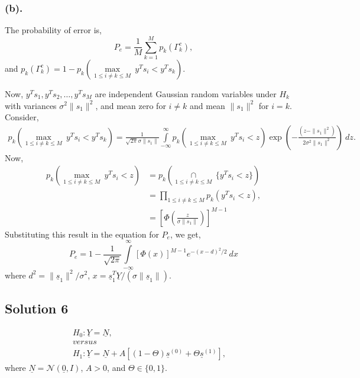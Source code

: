\documentclass[a4paper,english,12pt]{article}
\newcommand{\ubar}[1]{\underline{#1}}
\begin{document}
\subsubsection*{(b).} 
The probability of error is,
\begin{equation*}
P_e=\frac{1}{M}\sum\limits_{k=1}^{M}p_k(\Gamma_k^c),
\end{equation*}
and $p_k(\Gamma_k^c)=1-p_k\left(\underset{1\leq i\neq k \leq M}{\max}~y^Ts_{i}< y^Ts_{k}\right)$.
\par Now, $y^Ts_{1},y^Ts_{2},\dots,y^Ts_{M}$ are independent Gaussian random variables under $H_k$ with variances $\sigma^2\|s_1\|^2$, and mean zero for $i\neq k$ and mean $\|s_1\|^2$ for $i=k$. Consider,
\begin{align*}
p_k\left(\underset{1\leq i\neq k \leq M}{\max}~y^Ts_{i}< y^Ts_{k}\right)=\frac{1}{\sqrt{2\pi}\sigma\|s_1\|}\int\limits_{-\infty}^{\infty} p_k\left(\underset{1\leq i\neq k \leq M}{\max}~y^Ts_{i}< z\right)\exp\left(-\frac{(z-\|s_1\|^2)}{2\sigma^2 \|s_1\|^2}\right)~dz.
\end{align*}
Now,
\begin{align*}
p_k\left(\underset{1\leq i\neq k \leq M}{\max}~y^Ts_{i}< z\right)&=p_k\left( \underset{1\leq i\neq k \leq M}{\cap}~\{y^Ts_{i}< z\}\right)\\
&=\prod\limits_{1\leq i\neq k \leq M} p_k\left( y^Ts_{i}< z\right),\\
&=\left[ \Phi\left(\frac{z}{\sigma \|s_1\|} \right)\right]^{M-1}
\end{align*}
Substituting this result in the equation for $P_e$, we get,
\begin{equation*}
P_e=1-\frac{1}{\sqrt{2\pi}}\int\limits_{-\infty}^{\infty} \left[\Phi(x)\right]^{M-1}e^{-(x-d)^2/2}~dx
\end{equation*}
where $d^2=\|\ubar{s}_1\|^2/\sigma^2$, $x=\ubar{s}_1^T\ubar{Y}/(\sigma \|\ubar{s}_1\|)$.

\hypertarget{solution6}{\subsection*{Solution 6}}
\begin{gather*}
H_0: \ubar{Y}=\ubar{N},\\
versus\hspace{200pt}\\
H_1: \ubar{Y}=\ubar{N}+A\left[(1-\Theta)\ubar{s}^{(0)}+\Theta\ubar{s}^{(1)}\right],
\end{gather*}
where 
$\underline{N}=\mathcal{N}(\underline{0},I)$, $A>0$, and $\Theta\in\{0,1\}$.
\end{document}
